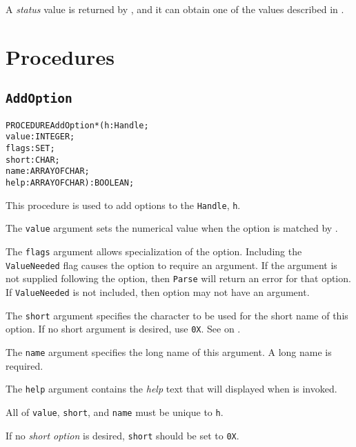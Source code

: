 A \emph{status} value is returned by , and it
can obtain one of the values described in
.


\section{Procedures}
\subsection{\texttt{AddOption}}\label{GetOpt:AddOption}
\begin{alltt}
PROCEDURE AddOption*(h     : Handle;
                     value : INTEGER;
                     flags : SET;
                     short : CHAR;
                     name  : ARRAY OF CHAR;
                     help  : ARRAY OF CHAR) : BOOLEAN;
\end{alltt}

\begin{semantics}
This procedure is used to add options to the \texttt{Handle},
\texttt{h}.

The \texttt{value} argument sets the numerical value when the option
is matched by .

The \texttt{flags} argument allows specialization of the option.
Including the \texttt{ValueNeeded} flag causes the option to require
an argument.  If the argument is not supplied following the option,
then \texttt{Parse} will return an error for that option.  If
\texttt{ValueNeeded} is not included, then option may not have an
argument.

The \texttt{short} argument specifies the \ascii character to be used
for the short name of this option.  If no short argument is desired,
use \texttt{0X}.  See  on
.

The \texttt{name} argument specifies the long name of this argument.
A long name is required.

The \texttt{help} argument contains the \emph{help} text that will
displayed when  is invoked.

All of \texttt{value}, \texttt{short}, and \texttt{name} must be
unique to \texttt{h}.

If no \emph{short option} is desired, \texttt{short} should be set to
\texttt{0X}.

\end{semantics}

